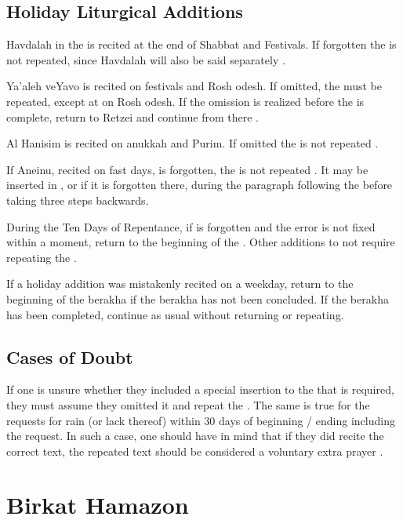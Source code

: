 \subsection{Holiday Liturgical Additions}

Havdalah in the \amidah is recited at the end of Shabbat and Festivals.  If forgotten the \amidah is not repeated, since Havdalah will also be said separately \parencite*[18:2 citing OC 422]{PH}.

Ya'aleh veYavo is recited on festivals and Rosh \bigheth odesh.  If omitted, the \amidah must be repeated, except at \arvit\space on Rosh \bigheth odesh.  If the omission is realized before the \amidah is complete, return to Retzei and continue from there \parencite{PH}.

Al Hanisim is recited on \bigheth anukkah and Purim.  If omitted the \amidah is not repeated \parencite*[citing OC 682]{PH}.

If Aneinu, recited on fast days, is forgotten, the \amidah is not repeated \parencite*[citing OC 565]{PH}. It may be inserted in , or if it is forgotten there, during the paragraph following the \amidah before taking three steps backwards.

During the Ten Days of Repentance, if  is forgotten and the error is not fixed within a moment, return to the beginning of the \amidahnospace.  Other additions to not require repeating the \amidahnospace.

If a holiday addition was mistakenly recited on a weekday, return to the beginning of the berakha if the berakha has not been concluded.  If the berakha has been completed, continue as usual without returning or repeating.

\subsection{Cases of Doubt}

If one is unsure whether they included a special insertion to the \amidah that is required, they must assume they omitted it and repeat the \amidahnospace.  The same is true for the requests for rain (or lack thereof) within 30 days of beginning / ending including the request.  In such a case, one should have in mind that if they did recite the correct text, the repeated text should be considered a voluntary extra prayer \parencite*[18:6]{PH}.

\section{Birkat Hamazon}

